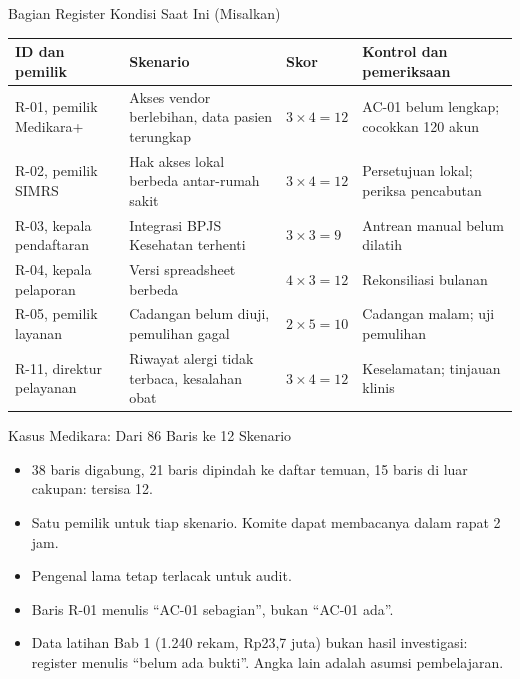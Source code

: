 \documentclass[aspectratio=169, table, 12pt]{beamer}
\begin{document}
\begin{frame}{{\Large Bagian Register Kondisi Saat Ini (Misalkan)}}
  \vspace{2pt}
  \scriptsize
  \begin{tabularx}{\textwidth}{|>{\raggedright\arraybackslash}p{}|>{\raggedright\arraybackslash}X|>{\raggedright\arraybackslash}p{}|>{\raggedright\arraybackslash}X|}
    \hline
    \textbf{ID dan pemilik} & \textbf{Skenario} & \textbf{Skor} & \textbf{Kontrol dan pemeriksaan} \\
    \hline
    R-01, pemilik Medikara+ & Akses vendor berlebihan, data pasien terungkap & $3 \times 4 = 12$ & AC-01
    belum lengkap; cocokkan 120 akun \\ \hline
    R-02, pemilik SIMRS & Hak akses lokal berbeda antar-rumah sakit & $3 \times 4 = 12$ & Persetujuan
    lokal; periksa pencabutan \\ \hline
    R-03, kepala pendaftaran & Integrasi BPJS Kesehatan terhenti & $3 \times 3 = 9$ & Antrean manual
    belum dilatih \\ \hline
    R-04, kepala pelaporan & Versi spreadsheet berbeda & $4 \times 3 = 12$ & Rekonsiliasi bulanan \\
    \hline
    R-05, pemilik layanan & Cadangan belum diuji, pemulihan gagal & $2 \times 5 = 10$ & Cadangan malam;
    uji pemulihan \\ \hline
    R-11, direktur pelayanan & Riwayat alergi tidak terbaca, kesalahan obat & $3 \times 4 = 12$ &
    Keselamatan; tinjauan klinis \\ \hline
  \end{tabularx}
\end{frame}

\begin{frame}{{\Large Kasus Medikara: Dari 86 Baris ke 12 Skenario}}
  \vspace{6pt}
  \small
  \begin{itemize}
    \item 38 baris digabung, 21 baris dipindah ke daftar temuan, 15 baris di luar cakupan: tersisa 12.
    \item Satu pemilik untuk tiap skenario. Komite dapat membacanya dalam rapat 2 jam.
    \item Pengenal lama tetap terlacak untuk audit.
    \item Baris R-01 menulis ``AC-01 sebagian'', bukan ``AC-01 ada''.
    \item Data latihan Bab 1 (1.240 rekam, Rp23,7 juta) bukan hasil investigasi: register menulis
          ``belum ada bukti''. Angka lain adalah asumsi pembelajaran.
  \end{itemize}
\end{frame}
\end{document}
